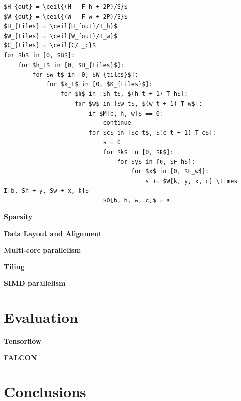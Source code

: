 \documentclass{article}
\begin{document}
\begin{lstlisting}[mathescape]
$H_{out} = \ceil{(H - F_h + 2P)/S}$
$W_{out} = \ceil{(W - F_w + 2P)/S}$
$H_{tiles} = \ceil{H_{out}/T_h}$
$W_{tiles} = \ceil{W_{out}/T_w}$
$C_{tiles} = \ceil{C/T_c}$
for $b$ in [0, $B$]:
    for $h_t$ in [0, $H_{tiles}$]:
        for $w_t$ in [0, $W_{tiles}$]:
            for $k_t$ in [0, $K_{tiles}$]:
                for $h$ in [$h_t$, $(h_t + 1) T_h$]:
                    for $w$ in [$w_t$, $(w_t + 1) T_w$]:
                        if $M[b, h, w]$ == 0:
                            continue
                        for $c$ in [$c_t$, $(c_t + 1) T_c$]:
                            s = 0
                            for $k$ in [0, $K$]:
                                for $y$ in [0, $F_h$]:
                                    for $x$ in [0, $F_w$]:
                                        s += $W[k, y, x, c] \times I[b, Sh + y, Sw + x, k]$
                            $O[b, h, w, c]$ = s

\end{lstlisting}

\textbf{Sparsity}

\textbf{Data Layout and Alignment}

\textbf{Multi-core parallelism}

\textbf{Tiling}

\textbf{SIMD parallelism}

\section{Evaluation}
\textbf{Tensorflow}

\textbf{FALCON}
\label{sec:eval}

\section{Conclusions}
\label{sec:conclusion}


\nocite{*}
{}
\end{document}
